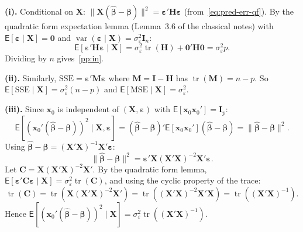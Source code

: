 \documentclass[12pt,a4paper]{article}
\makeatletter
\theoremstyle{definition}
\renewenvironment{proof}[1][\proofname]{\par
  \pushQED{\qed}%
  \normalfont \topsep6\p@\@plus6\p@\relax
  \trivlist
  \item[\hskip\labelsep\bfseries #1\@addpunct{.}]\ignorespaces
}{%
  \popQED\endtrivlist\@endpefalse
}
\newcommand\expc{\mathsf{E}}
\DeclareMathOperator\var{var}
\DeclareMathOperator\tr{tr}
\newcommand{\SSE}{\mathrm{SSE}}
\newcommand{\MSE}{\mathrm{MSE}}
\newcommand{\bX}{\mathbf{X}}
\newcommand{\bx}{\mathbf{x}}
\def\bb{\boldsymbol{\beta}}
\newcommand{\be}{\boldsymbol{\varepsilon}}
\newcommand{\bI}{\mathbf{I}}
\newcommand{\bH}{\mathbf{H}}
\newcommand{\bM}{\mathbf{M}}
\newcommand{\bzero}{\mathbf{0}}
\newcommand{\bC}{\mathbf{C}}
\newcommand{\hbb}{\hat{\boldsymbol{\beta}}}
\makeatother
\begin{document}
\begin{proof}
\textbf{(i).} Conditional on $\bX$: $\|\bX(\hbb-\bb)\|^2 = \be'\bH\be$ (from~\eqref{eq:pred-err-qf}). By the quadratic form expectation lemma (Lemma~3.6 of the classical notes) with $\expc[\be \mid \bX] = \bzero$ and $\var(\be \mid \bX) = \sigma_\varepsilon^2\bI_n$:
\[
\expc[\be'\bH\be \mid \bX] = \sigma_\varepsilon^2\tr(\bH) + \bzero'\bH\bzero = \sigma_\varepsilon^2 p.
\]
Dividing by $n$ gives~\ref{pp:in}.

\textbf{(ii).} Similarly, $\SSE = \be'\bM\be$ where $\bM = \bI - \bH$ has $\tr(\bM) = n - p$. So $\expc[\SSE \mid \bX] = \sigma_\varepsilon^2(n-p)$ and $\expc[\MSE \mid \bX] = \sigma_\varepsilon^2$.

\textbf{(iii).} Since $\bx_0$ is independent of $(\bX, \be)$ with $\expc[\bx_0\bx_0'] = \bI_p$:
\[
\expc[(\bx_0'(\hbb-\bb))^2 \mid \bX, \be] = (\hbb-\bb)'\expc[\bx_0\bx_0'](\hbb-\bb) = \|\hbb-\bb\|^2.
\]
Using $\hbb - \bb = (\bX'\bX)^{-1}\bX'\be$:
\[
\|\hbb-\bb\|^2 = \be'\bX(\bX'\bX)^{-2}\bX'\be.
\]
Let $\bC = \bX(\bX'\bX)^{-2}\bX'$. By the quadratic form lemma, $\expc[\be'\bC\be \mid \bX] = \sigma_\varepsilon^2\tr(\bC)$, and using the cyclic property of the trace:
\[
\tr(\bC) = \tr(\bX(\bX'\bX)^{-2}\bX') = \tr((\bX'\bX)^{-2}\bX'\bX) = \tr((\bX'\bX)^{-1}).
\]
Hence $\expc[(\bx_0'(\hbb-\bb))^2 \mid \bX] = \sigma_\varepsilon^2\tr((\bX'\bX)^{-1})$.


\end{proof}
\end{document}
